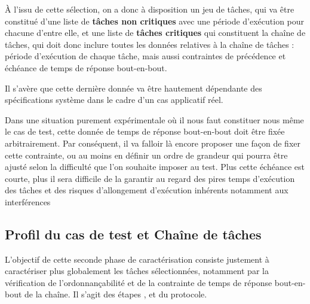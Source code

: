 \documentclass[french, a4paper, 11pt, twoside, pdftex]{StyleThese}
\begin{document}
    		À l'issu de cette sélection, on a donc à disposition un jeu de tâches, qui va être constitué d'une liste de \textbf{tâches non critiques} avec une période d'exécution pour chacune d'entre elle, et une liste de \textbf{tâches critiques} qui constituent la chaîne de tâches, qui doit donc inclure toutes les données relatives à la chaîne de tâches : période d'exécution de chaque tâche, mais aussi contraintes de précédence et échéance de temps de réponse bout-en-bout.
    		
    		Il s'avère que cette dernière donnée va être hautement dépendante des spécifications système dans le cadre d'un cas applicatif réel. 
    		
    		Dans une situation purement expérimentale où il nous faut constituer nous même le cas de test, cette donnée de temps de réponse bout-en-bout doit être fixée arbitrairement. Par conséquent, il va falloir là encore proposer une façon de fixer cette contrainte, ou au moins en définir un ordre de grandeur qui pourra être ajusté selon la difficulté que l'on souhaite imposer au test. Plus cette échéance est courte, plus il sera difficile de la garantir au regard des pires temps d'exécution des tâches et des risques d'allongement d'exécution inhérents notamment aux interférences
    		
                    
    \subsection{Profil du cas de test et Chaîne de tâches}
    
L'objectif de cette seconde phase de caractérisation consiste justement à caractériser plus globalement les tâches sélectionnées, notamment par la vérification de l'ordonnançabilité et de la contrainte de temps de réponse bout-en-bout de la chaîne. Il s'agit des étapes ,  et  du protocole.
\end{document}
